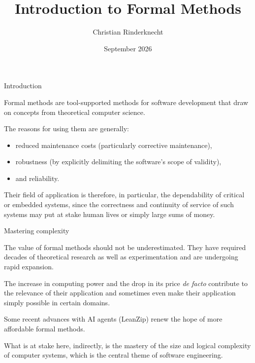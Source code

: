 \documentclass[compress,dvipdfmx]{beamer}
\title{Introduction to Formal Methods}
\author{Christian Rinderknecht}
\institute{Eszterházy Károly Katolikus Egyetem}
\date{September 2026}
\begin{document}
\frame{\maketitle}

%
\begin{frame}{Introduction}

  Formal methods are tool-supported methods for software development
  that draw on concepts from theoretical computer science.

  \bigskip

  The reasons for using them are generally:
  \begin{itemize}

    \item reduced maintenance costs (particularly corrective
      maintenance),

    \item robustness (by explicitly delimiting the software's scope of
      validity),

    \item and reliability.

  \end{itemize}

  \bigskip

  Their field of application is therefore, in particular, the
  dependability of critical or embedded systems, since the correctness
  and continuity of service of such systems may put at stake human
  lives or simply large sums of money.

\end{frame}

%
\begin{frame}{Mastering complexity}

  The value of formal methods should not be underestimated.  They have
  required decades of theoretical research as well as experimentation
  and are undergoing rapid expansion.

  \bigskip

  The increase in computing power and the drop in its price \emph{de
  facto} contribute to the relevance of their application and
  sometimes even make their application simply possible in certain
  domains.

  \bigskip

  Some recent advances with AI agents (LeanZip) renew the hope of
  more affordable formal methods.

  \bigskip

  What is at stake here, indirectly, is the mastery of the size and
  logical complexity of computer systems, which is the central theme
  of software engineering.

\end{frame}
\end{document}
